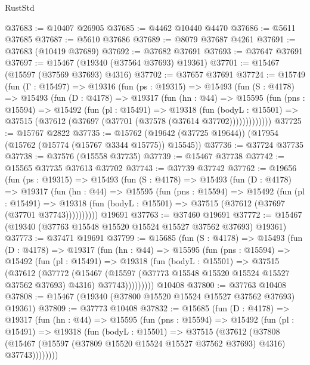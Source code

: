 \begin{lexlean}{RustStd}
\begin{coremodule}
@37683 := @10407 @26905
@37685 := @4462 @10440 @4470
@37686 := @5611 @37685
@37687 := @5610 @37686
@37689 := @8079 @37687 @4261
@37691 := @37683 (@10419 @37689)
@37692 := @37682 @37691
@37693 := @37647 @37691
@37697 := @15467 (@19340 (@37564 @37693) @19361)
@37701 := @15467 (@15597 (@37569 @37693) @4316)
@37702 := @37657 @37691
@37724 := @15749
    (fun (Γ : @15497) =>
    @19316
      (fun (ps : @19315) =>
      @15493
        (fun (S : @4178) =>
        @15493
          (fun (D : @4178) =>
          @19317
            (fun (hn : @44) =>
            @15595
              (fun (pns : @15594) =>
              @15492
                (fun (pl : @15491) =>
                @19318
                  (fun (bodyL : @15501) =>
                  @37515 (@37612 (@37697 (@37701 (@37578 (@37614 @37702)))))))))))))
@37725 := @15767 @2822
@37735 := @15762 (@19642 (@37725 @19644)) (@17954 (@15762 (@15774 (@15767 @3344 @15775)) @15545))
@37736 := @37724 @37735
@37738 := @37576 (@15558 @37735)
@37739 := @15467 @37738
@37742 := @15565 @37735 @37613 @37702
@37743 := @37739 @37742
@37762 := @19656
    (fun (ps : @19315) =>
    @15493
      (fun (S : @4178) =>
      @15493
        (fun (D : @4178) =>
        @19317
          (fun (hn : @44) =>
          @15595
            (fun (pns : @15594) =>
            @15492
              (fun (pl : @15491) =>
              @19318 (fun (bodyL : @15501) => @37515 (@37612 (@37697 (@37701 @37743))))))))))
    @19691
@37763 := @37460 @19691
@37772 := @15467 (@19340 (@37763 @15548 @15520 @15524 @15527 @37562 @37693) @19361)
@37773 := @37471 @19691
@37799 := @15685
    (fun (S : @4178) =>
    @15493
      (fun (D : @4178) =>
      @19317
        (fun (hn : @44) =>
        @15595
          (fun (pns : @15594) =>
          @15492
            (fun (pl : @15491) =>
            @19318
              (fun (bodyL : @15501) =>
              @37515
                (@37612
                  (@37772
                    (@15467
                      (@15597 (@37773 @15548 @15520 @15524 @15527 @37562 @37693) @4316)
                      @37743)))))))))
    @10408
@37800 := @37763 @10408
@37808 := @15467 (@19340 (@37800 @15520 @15524 @15527 @37562 @37693) @19361)
@37809 := @37773 @10408
@37832 := @15685
    (fun (D : @4178) =>
    @19317
      (fun (hn : @44) =>
      @15595
        (fun (pns : @15594) =>
        @15492
          (fun (pl : @15491) =>
          @19318
            (fun (bodyL : @15501) =>
            @37515
              (@37612
                (@37808
                  (@15467 (@15597 (@37809 @15520 @15524 @15527 @37562 @37693) @4316) @37743))))))))

\end{coremodule}
\end{lexlean}
